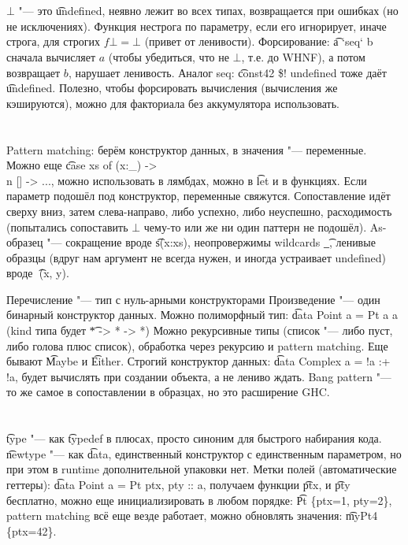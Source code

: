 \section{} %
$\bot$ "--- это \t{undefined}, неявно лежит во всех типах,
возвращается при ошибках (но не исключениях).
Функция нестрога по параметру, если его игнорирует, иначе строга,
для строгих $f \bot = \bot$ (привет от ленивости).
Форсирование: \t{a `seq` b} сначала вычисляет $a$ (чтобы убедиться, что не $\bot$,
т.е. до WHNF), а потом возвращает $b$, нарушает ленивость.
Аналог seq: \t{const42 \$! undefined} тоже даёт \t{undefined}.
Полезно, чтобы форсировать вычисления (вычисления же кэшируются),
можно для факториала без аккумулятора использовать.

\section{} %
Pattern matching: берём конструктор данных, в значения "--- переменные.
Можно еще \t{case xs of (x:_) -> \\n [] -> ...}, можно использовать в лямбдах,
можно в \t{let} и в функциях.
Если параметр подошёл под конструктор, переменные свяжутся.
Сопоставление идёт сверху вниз, затем слева-направо, либо успехно, либо неуспешно,
расходимость (попытались сопоставить $\bot$ чему-то или же ни один паттерн не подошёл).
As-образец "--- сокращение вроде \t{s\@(x:xs)}, неопровержимы wildcards \t{\_},
ленивые образцы (вдруг нам аргумент не всегда нужен, и иногда устраивает undefined) вроде \t{~(x, y)}.

Перечисление "--- тип с нуль-арными конструкторами
Произведение "--- один бинарный конструктор данных.
Можно полиморфный тип: \t{data Point a = Pt a a} (kind типа будет \t{* -> * -> *})
Можно рекурсивные типы (список "--- либо пуст, либо голова плюс список), обработка
через рекурсию и pattern matching.
Еще бывают \t{Maybe} и \t{Either}.
Строгий конструктор данных: \t{data Complex a = !a :+ !a}, будет вычислять при создании объекта,
а не лениво ждать.
Bang pattern "--- то же самое в сопоставлении в образцах, но это расширение GHC.

\section{} %
\t{type} "--- как \t{typedef} в плюсах, просто синоним для быстрого набирания кода.
\t{newtype} "--- как \t{data}, единственный конструктор с единственным параметром,
но при этом в runtime дополнительной упаковки нет.
Метки полей (автоматические геттеры): \t{data Point a = Pt {ptx, pty :: a}},
получаем функции \t{ptx}, и \t{pty} бесплатно,
можно еще инициализировать в любом порядке: \t{Pt \{ptx=1, pty=2\}},
pattern matching всё еще везде работает,
можно обновлять значения: \t{myPt4 \{ptx=42\}}.

